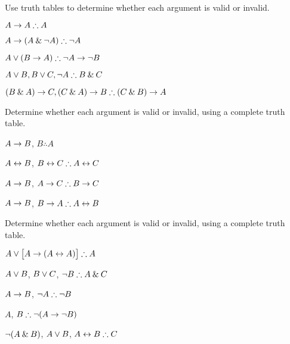 \practiceproblems

\problempart
\label{pr.TT.valid}
Use truth tables to determine whether each argument is valid or invalid.
\begin{earg}
\item $A\eif A \therefore A$ %
\item $A\eif(A\eand\enot A) \therefore \enot A$ %
\item $A\eor(B\eif A) \therefore \enot A \eif \enot B$ %
\item $A\eor B, B\eor C, \enot A \therefore B \eand C$ %
\item $(B\eand A)\eif C, (C\eand A)\eif B \therefore (C\eand B)\eif A$ %
\end{earg}

\noindent\problempart
\label{pr.TT.valid2}
Determine whether each argument is valid or invalid, using a complete truth table.
\begin{earg}
\item $A\rightarrow B$, $B \therefore  A$ %

\item $A\leftrightarrow B$, $B\eiff C \therefore A\eiff C$ %

\item $A \rightarrow B$, $A \eif C\therefore B \eif C$ %

\item $A \rightarrow B$, $B \eif A\therefore A \eiff B$ %

\end{earg}

\noindent\problempart
\label{pr.TT.valid3}
Determine whether each argument is valid or invalid, using a complete truth table.
\begin{earg}
\item $A\eor\bigl[A\eif(A\eiff A)\bigr] \therefore  A $\vspace{.5ex}%
\item $A\vee B$, $B\vee C$, $\enot B \therefore A \eand C$\vspace{.5ex} %
\item $A \rightarrow B$, $\enot A\therefore \enot B$ \vspace{.5ex}%
\item $A$, $B\therefore \enot(A\eif \enot B)$ \vspace{.5ex}%
\item $\neg(A \mathbin{\&} B)$, $A \vee B$, $A \eiff B\therefore C$ \vspace{.5ex}%
\end{earg}



